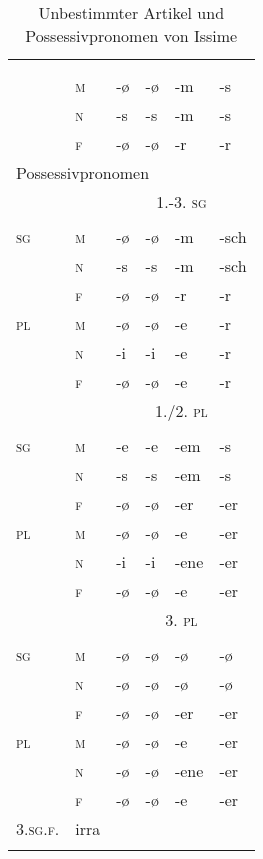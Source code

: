 \begin{table}[H]
	\caption{Unbestimmter Artikel und Possessivpronomen von Issime \citep[13-16, 82-84]{Perinetto1981}}\label{table104}
	\begin{tabular}{llllll}
		\lsptoprule
		\multicolumn{6}{l}{unbestimmter Artikel}\\
		&  & \NOM & \AKK & \DAT & \GEN\\\midrule
		& \textsc{m} & {}-ø & {}-ø & {}-m & {}-s\\
		& \textsc{n} & {}-s & {}-s & {}-m & {}-s\\
		& \textsc{f} & {}-ø & {}-ø & {}-r & {}-r\\\midrule
		\multicolumn{6}{l}{Possessivpronomen}\\
		& & \multicolumn{4}{c}{\scshape 1.-3. \textsc{sg}}\\\cmidrule(lr){1-6}
		&  & \NOM & \AKK & \DAT & \GEN\\\midrule
		\textsc{sg} & \textsc{m} & {}-ø & {}-ø & {}-m & {}-sch\\
		& \textsc{n} & {}-s & {}-s & {}-m & {}-sch\\
		& \textsc{f} & {}-ø & {}-ø & {}-r & {}-r\\
		\textsc{pl} & \textsc{m} & {}-ø & {}-ø & {}-e & {}-r\\
		& \textsc{n} & {}-i & {}-i & {}-e & {}-r\\
		& \textsc{f} & {}-ø & {}-ø & {}-e & {}-r\\\midrule
		& & \multicolumn{4}{c}{\scshape 1./2. \textsc{pl}} \\\cmidrule(lr){1-6}
		&  & \NOM & \AKK & \DAT & \GEN\\\midrule
		\textsc{sg} & \textsc{m} & {}-e & {}-e & {}-em & {}-s\\
		& \textsc{n} & {}-s & {}-s & {}-em & {}-s\\
		& \textsc{f} & {}-ø & {}-ø & {}-er & {}-er\\
		\textsc{pl} & \textsc{m} & {}-ø & {}-ø & {}-e & {}-er\\
		& \textsc{n} & {}-i & {}-i & {}-ene & {}-er\\
		& \textsc{f} & {}-ø & {}-ø & {}-e & {}-er\\\midrule
		& & \multicolumn{4}{c}{\scshape 3. \textsc{pl}} \\\cmidrule(lr){1-6}
		&  & \NOM & \AKK & \DAT & \GEN\\\midrule
		\textsc{sg} & \textsc{m} & {}-ø & {}-ø & {}-ø & {}-ø\\
		& \textsc{n} & {}-ø & {}-ø & {}-ø & {}-ø\\
		& \textsc{f} & {}-ø & {}-ø & {}-er & {}-er\\
		\textsc{pl} & \textsc{m} & {}-ø & {}-ø & {}-e & {}-er\\
		& \textsc{n} & {}-ø & {}-ø & {}-ene & {}-er\\
		& \textsc{f} & {}-ø & {}-ø & {}-e & {}-er\\
		\midrule
		\textsc{3.sg.f.} & irra &  &  &  & \\
		\lspbottomrule
	\end{tabular}
\end{table}

